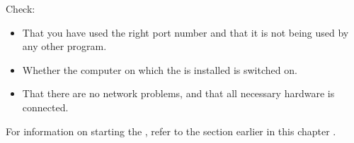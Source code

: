 % 
%
%
Check:
\begin{itemize}
\item That you have used the right port number and that it is not being used by any other program. 
\item Whether the computer on which the \gdagent is installed is switched on.
\item That there are no network problems, and that all necessary hardware is connected. 
\end{itemize}

For information on starting the \gdagent, refer to the section earlier in this chapter . 










